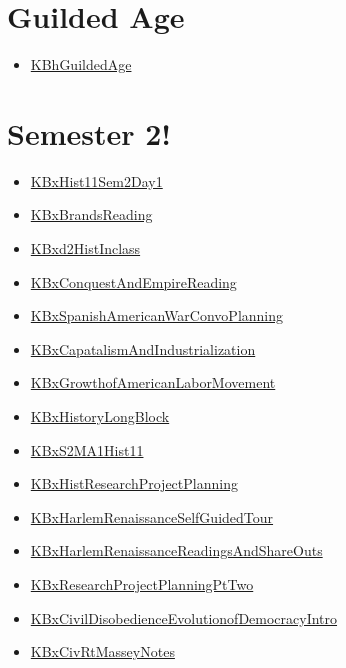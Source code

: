 \documentclass[letterpaper]{article}
\begin{document}
\section{Guilded Age}
\label{sec:orgade9982}
\begin{itemize}
\item \href{KBhGuildedAge.org}{KBhGuildedAge}
\end{itemize}

\section{Semester 2!}
\label{sec:orgbb60984}
\begin{itemize}
\item \href{KBxHist11Sem2Day1.org}{KBxHist11Sem2Day1}
\item \href{KBxBrandsReading.org}{KBxBrandsReading}
\item \href{KBxd2HistInclass.org}{KBxd2HistInclass}
\item \href{KBxConquestAndEmpireReading.org}{KBxConquestAndEmpireReading}
\item \href{KBxSpanishAmericanWarConvoPlanning.org}{KBxSpanishAmericanWarConvoPlanning}
\item \href{KBxCapatalismAndIndustrialization.org}{KBxCapatalismAndIndustrialization}
\item \href{KBxGrowthofAmericanLaborMovement.org}{KBxGrowthofAmericanLaborMovement}
\item \href{KBxHistoryLongBlock.org}{KBxHistoryLongBlock}
\item \href{KBxS2MA1Hist11.org}{KBxS2MA1Hist11}
\item \href{KBxHistResearchProjectPlanning.org}{KBxHistResearchProjectPlanning}
\item \href{KBxHarlemRenaissanceSelfGuidedTour.org}{KBxHarlemRenaissanceSelfGuidedTour}
\item \href{KBxHarlemRenaissanceReadingsAndShareOuts.org}{KBxHarlemRenaissanceReadingsAndShareOuts}
\item \href{KBxResearchProjectPlanningPtTwo.org}{KBxResearchProjectPlanningPtTwo}
\item \href{KBxCivilDisobedienceEvolutionofDemocracyIntro.org}{KBxCivilDisobedienceEvolutionofDemocracyIntro}
\item \href{KBxCivRtMasseyNotes.org}{KBxCivRtMasseyNotes}
\end{itemize}
\end{document}
